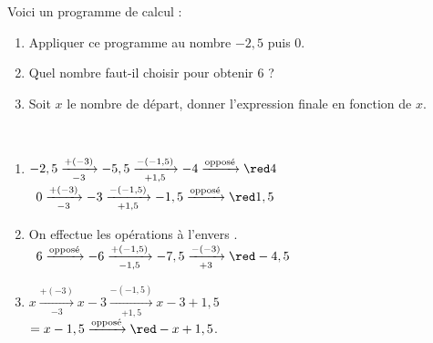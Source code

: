 \begin{exercice*}
   Voici un programme de calcul :
   \begin{center}
   \end{center}
   \begin{enumerate}
      \item Appliquer ce programme au nombre $-2,5$ puis 0.
      \item Quel nombre faut-il choisir pour obtenir 6 ?
      \item Soit $x$ le nombre de départ, donner l'expression finale en fonction de $x$.
   \end{enumerate}
\end{exercice*}

\begin{corrige}
   \ \\ [-5mm]
   \begin{enumerate}
      \item $-2,5 \xrightarrow[-3]{+(-3)} -5,5 \xrightarrow[+1,5]{-(-1,5)} -4 \xrightarrow{\text{opposé}} {\red 4}$ \\ [1mm]
         \quad\, $0 \xrightarrow[-3]{+(-3)} -3 \xrightarrow[+1,5]{-(-1,5)} -1,5 \xrightarrow{\text{opposé}} {\red 1,5}$ \\ [1mm]
      \item On effectue les opérations \og à l'envers \fg. \\ [1mm]
         \quad\, $6 \xrightarrow{\text{opposé}} -6 \xrightarrow[-1,5]{+(-1,5)} -7,5  \xrightarrow[+3]{-(-3)}{\red -4,5}$ \\ [1mm]
      \item $x \xrightarrow[-3]{+(-3)} x-3 \xrightarrow[+1,5]{-(-1,5)} x-3+1,5$ \\
         \quad\; $=x-1,5 \xrightarrow{\text{opposé}}{\red -x+1,5}$. \\ [1mm]
   \end{enumerate}
\end{corrige}
